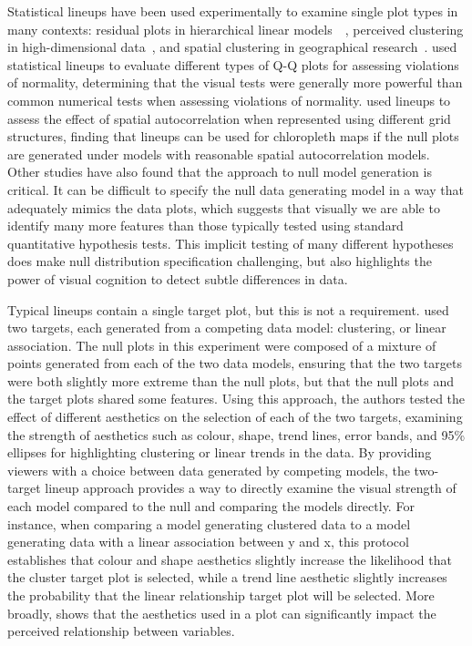 \documentclass[letterpaper]{ar-1col}\usepackage[]{graphicx}\usepackage[]{color}
\begin{document}
Statistical lineups have been used experimentally to examine single plot types in many contexts: residual plots in hierarchical linear models~~\citep{loyAreYouNormal2015}, perceived clustering in high-dimensional data~\citep{roychowdhuryUsingVisualStatistical2015}, and spatial clustering in geographical research~\citep{widen2016graphical}. \citet{loyVariationsQQPlots2016} used statistical lineups to evaluate different types of Q-Q plots for assessing violations of normality, determining that the visual tests were generally more powerful than common numerical tests when assessing violations of normality. \citet{beechamMapLineUpsEffects2017} used lineups to assess the effect of spatial autocorrelation when represented using different grid structures, finding that lineups can be used for chloropleth maps if the null plots are generated under models with reasonable spatial autocorrelation models. Other studies have also found that the approach to null model generation is critical. It can be difficult to specify the null data generating model in a way that adequately mimics the data plots, which suggests that visually we are able to identify many more features than those typically tested using standard quantitative hypothesis tests. This implicit testing of many different hypotheses does make null distribution specification challenging, but also highlights the power of visual cognition to detect subtle differences in data.

Typical lineups contain a single target plot, but this is not a requirement. \citet{vanderplasClustersBeatTrend2017} used two targets, each generated from a competing data model: clustering, or linear association. The null plots in this experiment were composed of a mixture of points generated from each of the two data models, ensuring that the two targets were both slightly more extreme than the null plots, but that the null plots and the target plots shared some features. Using this approach, the authors tested the effect of different aesthetics on the selection of each of the two targets, examining the strength of aesthetics such as colour, shape, trend lines, error bands, and 95\% ellipses for highlighting clustering or linear trends in the data. By providing viewers with a choice between data generated by competing models, the two-target lineup approach provides a way to directly examine the visual strength of each model compared to the null and comparing the models directly. For instance, when comparing a model generating clustered data to a model generating data with a linear association between y and x, this protocol establishes that colour and shape aesthetics slightly increase the likelihood that the cluster target plot is selected, while a trend line aesthetic slightly increases the probability that the linear relationship target plot will be selected. More broadly, \citet{vanderplasClustersBeatTrend2017} shows that the aesthetics used in a plot can significantly impact the perceived relationship between variables.
\end{document}
